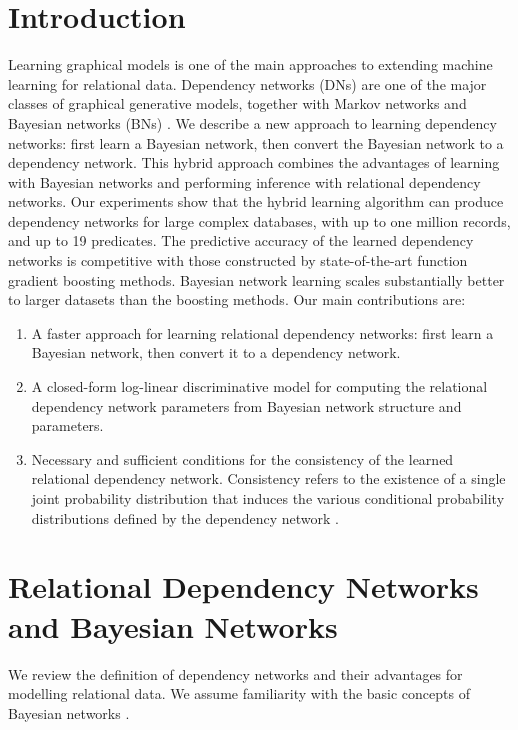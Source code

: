 \documentclass[runningheads,a4paper]{llncs}
\begin{document}
\section{Introduction} \label{sec:intro} Learning graphical models is one of the main approaches to extending machine learning for relational data. 
Dependency networks (DNs) \cite{Heckerman2000} are one of the major classes of graphical generative models, together with Markov networks and Bayesian networks (BNs) \cite{Pearl1988}. We describe a new approach to learning dependency networks: first learn a Bayesian network, then convert the Bayesian network to a dependency network. 
This hybrid approach combines the advantages of learning with Bayesian networks and performing inference with relational dependency networks. 
Our experiments show that the hybrid learning algorithm can produce dependency networks for large complex databases, with up to one million records, and up to 19 predicates. The predictive accuracy of the learned dependency networks is competitive with those constructed by state-of-the-art function gradient boosting methods.
Bayesian network learning scales substantially better   to larger datasets than the boosting methods.
%
Our main contributions are:
\begin{enumerate}
\item A faster approach for learning relational dependency networks: first learn a Bayesian network, then convert it to a dependency network.
\item A closed-form log-linear discriminative model for computing the relational dependency network parameters from Bayesian network structure and parameters.
\item Necessary and sufficient conditions for the consistency of the learned relational dependency network. Consistency refers to the existence of a single joint probability distribution that induces the various conditional probability distributions defined by the dependency network \cite{Heckerman2000}.
\end{enumerate}
  
 \section{Relational Dependency Networks and Bayesian Networks} We review the definition of dependency networks and their advantages for modelling relational data. We assume familiarity with the basic concepts of Bayesian networks \cite{Pearl1988}.
 
\end{document}
